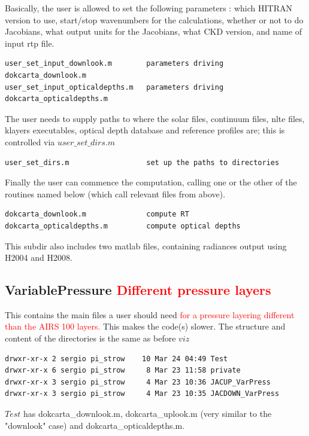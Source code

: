 \documentclass[12pt]{article}
\begin{document}
Basically, the user is allowed to set the 
following parameters : which HITRAN version to use, start/stop wavenumbers for
the calculations, whether or not to do Jacobians, what output units for the
Jacobians, what CKD version, and name of input rtp file.
\begin{verbatim}
user_set_input_downlook.m        parameters driving dokcarta_downlook.m
user_set_input_opticaldepths.m   parameters driving dokcarta_opticaldepths.m
\end{verbatim}

The user needs to supply paths to where the solar files, continuum files,
nlte files, klayers executables, optical depth database and reference profiles
are; this is controlled via $user\_set\_dirs.m$
\begin{verbatim}
user_set_dirs.m                  set up the paths to directories
\end{verbatim}

Finally the user can commence the computation, calling one or the other
of the routines named below (which call relevant files from above).
\begin{verbatim}
dokcarta_downlook.m              compute RT
dokcarta_opticaldepths.m         compute optical depths
\end{verbatim}

This subdir also includes two matlab files, containing radiances output
using H2004 and H2008.

\subsection{VariablePressure \textcolor{red}{Different pressure layers}}
This contains the main files a user should need \textcolor{red}{for a 
pressure layering different than the AIRS 100 layers.} This makes the code(s)
slower. The structure and content of the directories is the same as before 
$viz$

\begin{verbatim}
drwxr-xr-x 2 sergio pi_strow    10 Mar 24 04:49 Test
drwxr-xr-x 6 sergio pi_strow     8 Mar 23 11:58 private
drwxr-xr-x 3 sergio pi_strow     4 Mar 23 10:36 JACUP_VarPress
drwxr-xr-x 3 sergio pi_strow     4 Mar 23 10:35 JACDOWN_VarPress
\end{verbatim}

\noindent $Test$ has dokcarta\_downlook.m, dokcarta\_uplook.m (very similar to 
the "downlook" case) and dokcarta\_opticaldepths.m.\\
\end{document}
